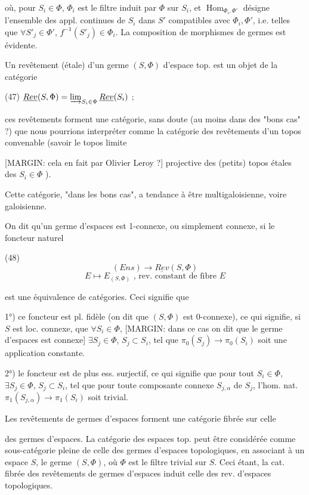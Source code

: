 où, pour $S_i \in \Phi$, $\Phi_i$ est le filtre induit par $\Phi$ sur $S_i$, et $\operatorname{Hom}_{\Phi_i, \Phi'}$ désigne l'ensemble des appl. continues de $S_i$ dans $S'$ compatibles avec $\Phi_i, \Phi'$, i.e. telles que $\forall S'_j \in \Phi'$, $f^{-1}(S'_j) \in \Phi_i$. La composition de morphismes de germes est évidente.

Un revêtement (étale) d'un germe $(S,\Phi)$ d'espace top. est un objet de la catégorie

(47) $\underline{Rev}(S,\Phi) = \varinjlim_{S_i \in \Phi} \underline{Rev}(S_i)$ ;

ces revêtements forment une catégorie, sans doute (au moins dans des "bons cas" ?) que nous pourrions interpréter comme la catégorie des revêtements d'un topos convenable (savoir le topos limite

\newpage


[MARGIN: cela en fait par Olivier Leroy ?]
projective des (petits) topos étales des $S_i \in \Phi$ ).

Cette catégorie, "dans les bons cas", a tendance
à être multigaloisienne, voire galoisienne.

On dit qu'un germe d'espaces est
1-connexe, ou simplement connexe, si
le foncteur naturel

(48)
$$(Ens) \longrightarrow \underline{Rev}(S, \Phi)$$
$$E \longmapsto E_{(S, \Phi)} \text{ , rev. constant de fibre } E$$

est une équivalence de catégories. Ceci
signifie que

1°) ce foncteur est pl. fidèle (on dit
que $(S, \Phi)$ est $0$-connexe), ce qui signifie,
si $S$ est loc. connexe, que $\forall S_i \in \Phi$,
[MARGIN: dans ce cas on dit que le germe d'espaces est connexe] $\exists S_j \in \Phi$, $S_j \subset S_i$, tel que $\pi_0(S_j) \to \pi_0(S_i)$
soit une application constante.

2°) le foncteur est de plus ess. surjectif,
ce qui signifie que pour tout $S_i \in \Phi$,
$\exists S_j \in \Phi$, $S_j \subset S_i$, tel que pour toute composante
connexe $S_{j,\alpha}$ de $S_j$, l'hom. nat.
$\pi_1(S_{j,\alpha}) \to \pi_1(S_i)$ soit trivial.

Les revêtements de germes d'espaces
forment une catégorie fibrée sur celle

\newpage


des germes d'espaces. La catégorie des espaces top. peut être considérée comme sous-catégorie pleine de celle des germes d'espaces topologiques, en associant à un espace $S$, le germe $(S, \Phi)$, où $\Phi$ est le filtre trivial sur $S$. Ceci étant, la cat. fibrée des revêtements de germes d'espaces induit celle des rev. d'espaces topologiques.

